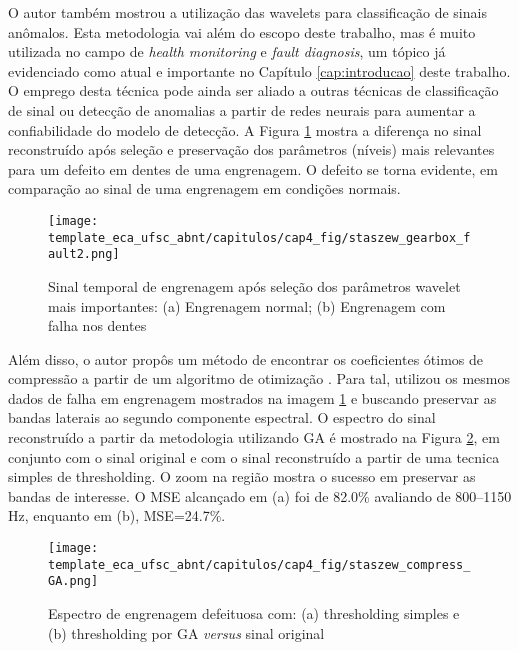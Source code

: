 O autor também mostrou a utilização das wavelets para classificação de sinais anômalos. Esta metodologia vai além do escopo deste trabalho, mas é muito utilizada no campo de \textit{health monitoring} e \textit{fault diagnosis}, um tópico já evidenciado como atual e importante no Capítulo \ref{cap:introducao} deste trabalho. O emprego desta técnica pode ainda ser aliado a outras técnicas de classificação de sinal ou detecção de anomalias a partir de redes neurais para aumentar a confiabilidade do modelo de detecção. A Figura \ref{fig:staszew_vib_wavelet2} mostra a diferença no sinal reconstruído após seleção e preservação dos parâmetros (níveis) mais relevantes para um defeito em dentes de uma engrenagem. O defeito se torna evidente, em comparação ao sinal de uma engrenagem em condições normais.

\begin{figure}[htb]
	\caption{Sinal temporal de engrenagem após seleção dos parâmetros wavelet mais importantes: (a) Engrenagem normal; (b) Engrenagem com falha nos dentes}
	\begin{center}
		\texttt{[image: template\_eca\_ufsc\_abnt/capitulos/cap4\_fig/staszew\_gearbox\_fault2.png]}
	\end{center}
	\label{fig:staszew_vib_wavelet2}
\end{figure}

Além disso, o autor propôs um método de encontrar os coeficientes ótimos de compressão a partir de um algoritmo de otimização   \cite{art:staszew_vib_wavelet_compress_genetic2}. Para tal, utilizou os mesmos dados de falha em engrenagem mostrados na imagem \ref{fig:staszew_vib_wavelet2} e buscando preservar as bandas laterais ao segundo componente espectral. O espectro do sinal reconstruído a partir da metodologia utilizando \gls{GA} é mostrado na Figura \ref{fig:staszew_vib_wavelet3}, em conjunto com o sinal original e com o sinal reconstruído a partir de uma tecnica simples de thresholding. O zoom na região mostra o sucesso em preservar as bandas de interesse. O \gls{MSE} alcançado em (a) foi de 82.0\% avaliando de 800–1150 Hz, enquanto em (b), \gls{MSE}=24.7\%.

\begin{figure}[htb]
	\caption{Espectro de engrenagem defeituosa com: (a) thresholding simples e (b) thresholding por \gls{GA} \textit{versus} sinal original}
	\begin{center}
		\texttt{[image: template\_eca\_ufsc\_abnt/capitulos/cap4\_fig/staszew\_compress\_GA.png]}
	\end{center}
	\label{fig:staszew_vib_wavelet3}
\end{figure}

